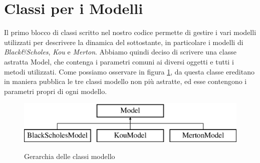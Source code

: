 \documentclass[a4paper,10pt]{report}
\theoremstyle{plain}
\theoremstyle{definition}
\theoremstyle{remark}
\begin{document}
\section{Classi per i Modelli}
Il primo blocco di classi scritto nel nostro codice permette di gestire i vari modelli utilizzati per descrivere la dinamica del sottostante, in particolare i modelli di \emph{Black\&Scholes}, \emph{Kou} e \emph{Merton}. Abbiamo quindi deciso di scrivere una classe astratta \textsf{Model}, che contenga i parametri comuni ai diversi oggetti e tutti i metodi utilizzati. Come possiamo osservare in figura \ref{modelbase}, da questa classe ereditano in maniera pubblica le tre classi modello non pi\`u astratte, ed esse contengono i parametri propri di ogni modello.
\begin{figure}[h!]
\begin{center}
\includegraphics[width=12cm]{img/classModel.eps}
\label{modelbase}
\caption{Gerarchia delle classi modello}
\end{center}
\end{figure}
\end{document}
